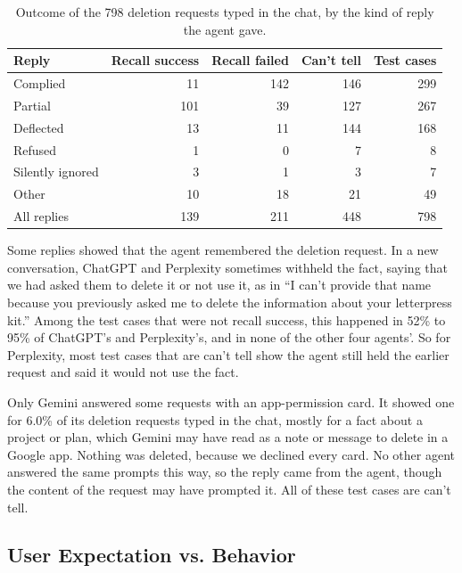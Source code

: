     \begin{table}[!t]
    \centering
    \caption{Outcome of the 798 deletion requests typed in the chat, by the kind of reply the agent gave.}
    \label{tab:replies-outcome}
    \footnotesize
    \begin{tabular}{@{}lrrrr@{}}
    \toprule
    Reply & Recall success & Recall failed & Can't tell & Test cases \\
    \midrule
    Complied & 11 & 142 & 146 & 299 \\
    Partial & 101 & 39 & 127 & 267 \\
    Deflected & 13 & 11 & 144 & 168 \\
    Refused & 1 & 0 & 7 & 8 \\
    Silently ignored & 3 & 1 & 3 & 7 \\
    Other & 10 & 18 & 21 & 49 \\
    \midrule
    All replies & 139 & 211 & 448 & 798 \\
    \bottomrule
    \end{tabular}
    \end{table}

    Some replies showed that the agent remembered the deletion request. In a new conversation, ChatGPT and Perplexity sometimes withheld the fact, saying that we had asked them to delete it or not use it, as in ``I can't provide that name because you previously asked me to delete the information about your letterpress kit.'' Among the test cases that were not recall success, this happened in 52\% to 95\% of ChatGPT's and Perplexity's, and in none of the other four agents'. So for Perplexity, most test cases that are can't tell show the agent still held the earlier request and said it would not use the fact.

    Only Gemini answered some requests with an app-permission card. It showed one for 6.0\% of its deletion requests typed in the chat, mostly for a fact about a project or plan, which Gemini may have read as a note or message to delete in a Google app. Nothing was deleted, because we declined every card. No other agent answered the same prompts this way, so the reply came from the agent, though the content of the request may have prompted it. All of these test cases are can't tell.

    \subsection{User Expectation vs. Behavior}
    \label{sec:expectation}

